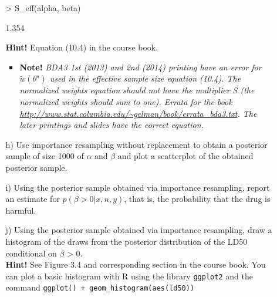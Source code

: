 \documentclass[11pt,a4paper,english]{article}
\begin{document}
\begin{enumerate}
\begin{itemize}
\begin{Schunk}
\begin{Sinput}
> S_eff(alpha, beta)
\end{Sinput}
\begin{Soutput}
[1] 1.354
\end{Soutput}
\end{Schunk}
\textbf{Hint!} Equation (10.4) in the course book.
\begin{itemize}
\item \textbf{Note!} {\it BDA3 1st (2013) and 2nd (2014) printing have an error
   for $\tilde{w}(\theta^s)$ used in the effective sample size
   equation (10.4). The normalized weights equation should not have the
   multiplier S (the normalized weights should sum to one). Errata for
   the book
   \url{http://www.stat.columbia.edu/~gelman/book/errata_bda3.txt}.
   The later printings and slides have the correct equation.}
 \end{itemize}
\item[h)] Use importance resampling without replacement to obtain a posterior sample of size 1000 of $\alpha$ and $\beta$ and plot a scatterplot of the obtained posterior sample.
\item[i)] Using the posterior sample obtained via importance resampling, report an estimate for $p(\beta > 0|x, n, y)$, that is, the probability that the drug is harmful.
\item[j)] Using the posterior sample obtained via importance resampling, draw a histogram of the draws from the posterior distribution of the LD50 conditional on $\beta$ > 0.\\
\textbf{Hint!} See Figure 3.4 and corresponding section in the course book. You can plot a basic histogram with R using the library {\tt ggplot2} and the command {\tt ggplot() + geom\_histogram(aes(ld50))}
\end{itemize}



\end{enumerate}
\end{document}
